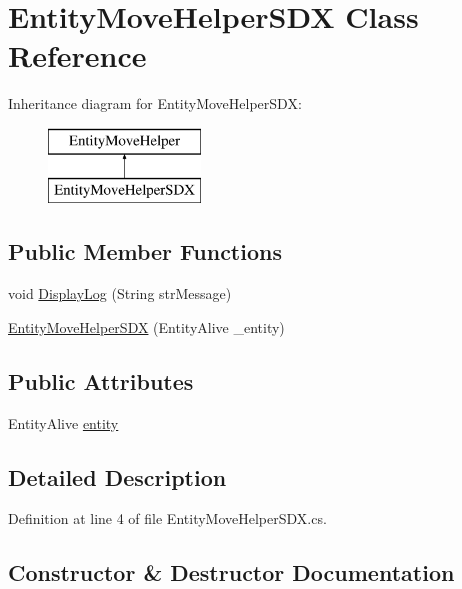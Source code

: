 \hypertarget{class_entity_move_helper_s_d_x}{}\section{Entity\+Move\+Helper\+S\+DX Class Reference}
\label{class_entity_move_helper_s_d_x}
Inheritance diagram for Entity\+Move\+Helper\+S\+DX\+:\begin{figure}[H]
\begin{center}
\leavevmode
\includegraphics[height=2.000000cm]{da/d35/class_entity_move_helper_s_d_x}
\end{center}
\end{figure}
\subsection*{Public Member Functions}
\begin{DoxyCompactItemize}
\item 
void \mbox{\hyperlink{class_entity_move_helper_s_d_x_a20b0833864e405fc378bef2a7b08e42d}{Display\+Log}} (String str\+Message)
\item 
\mbox{\hyperlink{class_entity_move_helper_s_d_x_abdee63a7d4819be5e8876e8e72d3edd8}{Entity\+Move\+Helper\+S\+DX}} (Entity\+Alive \+\_\+entity)
\end{DoxyCompactItemize}
\subsection*{Public Attributes}
\begin{DoxyCompactItemize}
\item 
Entity\+Alive \mbox{\hyperlink{class_entity_move_helper_s_d_x_a21c1914c566ca9a9ef40aca19ecddac0}{entity}}
\end{DoxyCompactItemize}


\subsection{Detailed Description}


Definition at line 4 of file Entity\+Move\+Helper\+S\+D\+X.\+cs.



\subsection{Constructor \& Destructor Documentation}
\mbox{\label{class_entity_move_helper_s_d_x_abdee63a7d4819be5e8876e8e72d3edd8}} 
